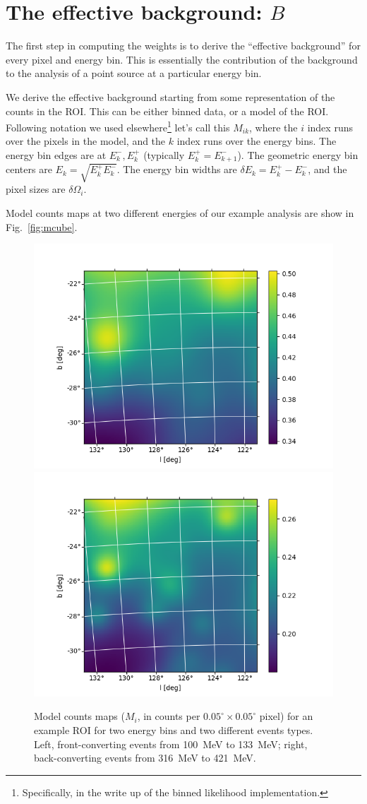 \documentclass[preprint]{aastex}
\begin{document}
\section{The effective background: \texorpdfstring{$B$}{B}}

The first step in computing the weights is to derive the ``effective
background'' for every pixel and energy bin.  This is essentially the
contribution of the background to the analysis of a point source at a
particular energy bin.

We derive the effective background starting from some representation
of the counts in the ROI.  This can be either
binned data, or a model of the ROI.  Following notation we used
elsewhere\footnote{Specifically, in the write up of the binned
  likelihood implementation.} let's call this $M_{ik}$, where the $i$
index runs over the pixels in the model, and the $k$ index runs over
the energy bins.  The energy bin edges are at $E_k^-, E_k^+$
(typically $E_k^+ = E_{k+1}^-$).  The geometric energy bin centers are
$E_k = \sqrt{E_k^+ E_k^-}$.  The energy bin widths are $\delta E_k = E_k^+
- E_k^-$, and the pixel sizes are $\delta \Omega_i$.

Model counts maps at two different energies of our example analysis are show in 
Fig.~\ref{fig:mcube}. 

\begin{figure}[h]  
\begin{centering}
\includegraphics[width=0.49\columnwidth]{figures/mcube_E00_00.png}
\includegraphics[width=0.49\columnwidth]{figures/mcube_E01_04.png}
\vspace{-0.10in}
\caption{\label{fig:beff}Model counts maps ($M_{i}$, in counts per $0.05^\circ\times0.05^\circ$ pixel)
  for an example ROI for two energy bins and two different events types. Left, front-converting events 
  from 100~MeV to 133~MeV; right, back-converting events from 316~MeV to 421~MeV.}
\end{centering}
\end{figure}
\end{document}
